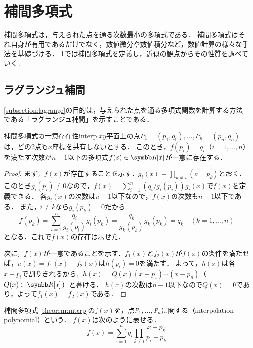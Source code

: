 \documentclass[../../main]{subfiles}
\begin{document}
\chapter{補間多項式}
\label{chapter:interp}
\begin{lead}
補間多項式は，与えられた点を通る次数最小の多項式である．
補間多項式はそれ自身が有用であるだけでなく，数値微分や数値積分など，数値計算の様々な手法を基礎づける．
\cref{chapter:interp}では補間多項式を定義し，近似の観点からその性質を調べていく．
\end{lead}

\section{ラグランジュ補間}
\label{section:lagrange}
\cref{subsection:lagrange}の目的は，与えられた点を通る多項式関数を計算する方法である「ラグランジュ補間」を示すことである．

\label{subsection:lagrange}
\begin{theorem}{補間多項式の一意存在性}{interp}
\(xy\)平面上の点\(P_1=(p_1,q_1),\dots,P_n=(p_n,q_n)\)は，どの2点も\(x\)座標を共有しないとする．
このとき，\(f(p_i)=q_i\)（\(i=1,\dots,n\)）を満たす次数が\(n-1\)以下の多項式\(f(x)\in\polyset{\numset{R}}{x}\)が一意に存在する．
\end{theorem}

\begin{proof}
まず，\(f(x)\)が存在することを示す．\(g_i(x)=\prod_{k\neq i}(x-p_k)\)とおく．
このとき\(g_i(p_i)\neq 0\)なので，\(f(x)=\sum_{i=1}^n(q_i/g_i(p_i))g_i(x)\)で\(f(x)\)を定義できる．
各\(g_i(x)\)の次数は\(n-1\)以下なので，\(f(x)\)の次数も\(n-1\)以下である．
また，\(i\neq k\)なら\(g_i(p_k)=0\)だから
\[
  f(p_k) = \sum_{i=1}^n\frac{q_i}{g_i(p_i)}g_i(p_k)
  = \frac{q_k}{g_k(p_k)}g_k(p_k)
  = q_k\quad(k=1,\dots,n)
\]
となる．これで\(f(x)\)の存在は示せた．

次に，\(f(x)\)が一意であることを示す．\(f_1(x)\)と\(f_2(x)\)が\(f(x)\)の条件を満たせば，\(h(x)=f_1(x)-f_2(x)\)は\(h(p_i)=0\)を満たす．
よって，\(h(x)\)は各\(x-p_i\)で割りきれるから，\(h(x)=Q(x)(x-p_1)\dotsm(x-p_n)\)（\(Q(x)\in\polyset{\numset{R}}{x}\)）と書ける．
\(h(x)\)の次数は\(n-1\)以下なので\(Q(x)=0\)であり，よって\(f_1(x)=f_2(x)\)である．
\end{proof}

\begin{definition}{補間多項式}{}
\cref{theorem:interp}の\(f(x)\)を，点\(P_1,\dots,P_n\)に関する（interpolation polynomial）という．
\(f(x)\)は次のように表せる．
\begin{equation}
  \label{equation:lagrange}
  f(x) = \sum_{i=1}^nq_i\prod_{k\neq i}\frac{x-p_k}{p_i-p_k}  
\end{equation}
\end{definition}
\end{document}
